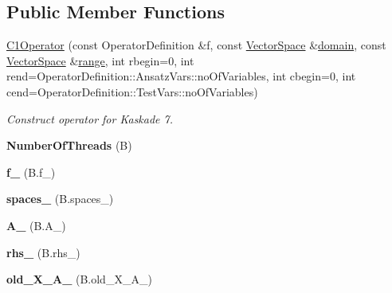 \subsection*{\-Public \-Member \-Functions}
\begin{DoxyCompactItemize}
\item 
\hyperlink{classSpacy_1_1Kaskade_1_1C1Operator_aa31e9f54fcbb4eb6c40c1cd467d25836}{\-C1\-Operator} (const \-Operator\-Definition \&f, const \hyperlink{classSpacy_1_1VectorSpace}{\-Vector\-Space} \&\hyperlink{classSpacy_1_1OperatorBase_a2588f9b3e0188820c4c494e63293dc6f}{domain}, const \hyperlink{classSpacy_1_1VectorSpace}{\-Vector\-Space} \&\hyperlink{classSpacy_1_1OperatorBase_ab19d3b7a6f290b1079248f1e567e53d6}{range}, int rbegin=0, int rend=\-Operator\-Definition\-::\-Ansatz\-Vars\-::no\-Of\-Variables, int cbegin=0, int cend=\-Operator\-Definition\-::\-Test\-Vars\-::no\-Of\-Variables)
\begin{DoxyCompactList}\small\item\em \-Construct operator for \-Kaskade 7. \end{DoxyCompactList}\item 
\hypertarget{classSpacy_1_1Kaskade_1_1C1Operator_ae3e41254f9aa1362559472ec8335c630}{{\bfseries \-Number\-Of\-Threads} (\-B)}\label{classSpacy_1_1Kaskade_1_1C1Operator_ae3e41254f9aa1362559472ec8335c630}

\item 
\hypertarget{classSpacy_1_1Kaskade_1_1C1Operator_ad00c8f06ca3fa6a5b9a3bef10d05cb5e}{{\bfseries f\-\_\-} (\-B.\-f\-\_\-)}\label{classSpacy_1_1Kaskade_1_1C1Operator_ad00c8f06ca3fa6a5b9a3bef10d05cb5e}

\item 
\hypertarget{classSpacy_1_1Kaskade_1_1C1Operator_a385533b1eff2a7d87962249587d07db9}{{\bfseries spaces\-\_\-} (\-B.\-spaces\-\_\-)}\label{classSpacy_1_1Kaskade_1_1C1Operator_a385533b1eff2a7d87962249587d07db9}

\item 
\hypertarget{classSpacy_1_1Kaskade_1_1C1Operator_a17ca470a8d5dc19211e290a924ce2750}{{\bfseries \-A\-\_\-} (\-B.\-A\-\_\-)}\label{classSpacy_1_1Kaskade_1_1C1Operator_a17ca470a8d5dc19211e290a924ce2750}

\item 
\hypertarget{classSpacy_1_1Kaskade_1_1C1Operator_a60e772d90f9a1546aa9d196fa93459d6}{{\bfseries rhs\-\_\-} (\-B.\-rhs\-\_\-)}\label{classSpacy_1_1Kaskade_1_1C1Operator_a60e772d90f9a1546aa9d196fa93459d6}

\item 
\hypertarget{classSpacy_1_1Kaskade_1_1C1Operator_ab5f1bb2cf0f05f6102520fba0798c985}{{\bfseries old\-\_\-\-X\-\_\-\-A\-\_\-} (\-B.\-old\-\_\-\-X\-\_\-\-A\-\_\-)}\label{classSpacy_1_1Kaskade_1_1C1Operator_ab5f1bb2cf0f05f6102520fba0798c985}


\end{DoxyCompactItemize}
